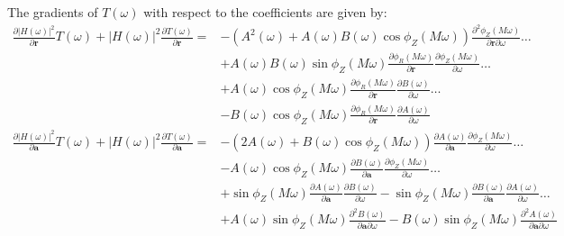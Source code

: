 \documentclass[a4paper,twoside,10pt,english]{report}
\begin{document}
The gradients of $T\left(\omega\right)$ with respect to the coefficients are
given by:
\begin{align*}
\frac{\partial\left|H\left(\omega\right)\right|^{2}}{\partial\boldsymbol{r}}
T\left(\omega\right)+\left|H\left(\omega\right)\right|^{2}
\frac{\partial T\left(\omega\right)}{\partial\boldsymbol{r}}=&
-\left(A^{2}\left(\omega\right)+A\left(\omega\right)B\left(\omega\right)
 \cos\phi_{Z}\left(M\omega\right)\right)
\frac{\partial^{2}\phi_{Z}\left(M\omega\right)}
     {\partial\boldsymbol{r}\partial\omega} \hdots \\
&+A\left(\omega\right)B\left(\omega\right)\sin\phi_{Z}\left(M\omega\right)
\frac{\partial\phi_{R}\left(M\omega\right)}{\partial\boldsymbol{r}}
\frac{\partial\phi_{Z}\left(M\omega\right)}{\partial\omega} \hdots \\
&+A\left(\omega\right)\cos\phi_{Z}\left(M\omega\right)
\frac{\partial\phi_{R}\left(M\omega\right)}{\partial\boldsymbol{r}}
\frac{\partial B\left(\omega\right)}{\partial\omega} \hdots \\
&-B\left(\omega\right)\cos\phi_{Z}\left(M\omega\right)
\frac{\partial\phi_{R}\left(M\omega\right)}{\partial\boldsymbol{r}}
\frac{\partial A\left(\omega\right)}{\partial\omega} \\
\frac{\partial\left|H\left(\omega\right)\right|^{2}}{\partial\boldsymbol{a}}
T\left(\omega\right)+\left|H\left(\omega\right)\right|^{2}
\frac{\partial T\left(\omega\right)}{\partial\boldsymbol{a}}=& 
-\left(2A\left(\omega\right)+
B\left(\omega\right)\cos\phi_{Z}\left(M\omega\right)\right)
\frac{\partial A\left(\omega\right)}{\partial\boldsymbol{a}} 
\frac{\partial\phi_{Z}\left(M\omega\right)}{\partial\omega} \hdots \\
&-A\left(\omega\right)\cos\phi_{Z}\left(M\omega\right)
\frac{\partial B\left(\omega\right)}{\partial\boldsymbol{a}} 
\frac{\partial\phi_{Z}\left(M\omega\right)}{\partial\omega} \hdots \\
&+\sin\phi_{Z}\left(M\omega\right)
\frac{\partial A\left(\omega\right)}{\partial\boldsymbol{a}} 
\frac{\partial B\left(\omega\right)}{\partial\omega} 
-\sin\phi_{Z}\left(M\omega\right)
\frac{\partial B\left(\omega\right)}{\partial\boldsymbol{a}} 
\frac{\partial A\left(\omega\right)}{\partial\omega} \hdots \\
&+A\left(\omega\right)\sin\phi_{Z}\left(M\omega\right)
\frac{\partial^{2}B\left(\omega\right)}{\partial\boldsymbol{a}\partial\omega}
-B\left(\omega\right)\sin\phi_{Z}\left(M\omega\right)
\frac{\partial^{2} A\left(\omega\right)}{\partial\boldsymbol{a}\partial\omega}
\end{align*}
\end{document}
